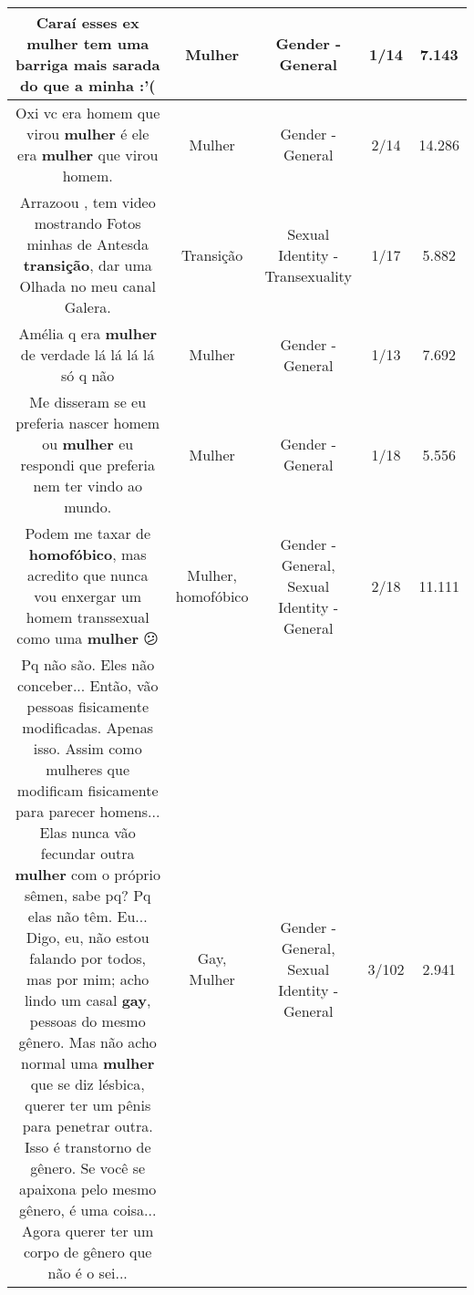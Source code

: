 \documentclass[11pt]{article}
\newlength\mylength
\begin{document}
\begin{center}
\begin{longtable}{|C{.65\mylength}|C{.30\mylength}|C{.12\mylength}|C{.12\mylength}|C{.12\mylength}|}
  \small Caraí esses ex \textbf{mulher} tem uma barriga mais  sarada do que a minha :'(\normalsize   & Mulher & Gender - General & 1/14 & 7.143 \\  \hline
  \small Oxi vc era homem que virou \textbf{mulher} é  ele era \textbf{mulher} que virou homem.\normalsize   & Mulher & Gender - General & 2/14 & 14.286 \\  \hline
  \small Arrazoou , tem video mostrando Fotos minhas de Antesda \textbf{transição}, dar uma Olhada no meu canal Galera.\normalsize   & Transição & Sexual Identity - Transexuality & 1/17 & 5.882 \\  \hline
  \small Amélia q era \textbf{mulher} de verdade lá lá lá lá só q não\normalsize   & Mulher & Gender - General & 1/13 & 7.692 \\  \hline
  \small Me disseram se eu preferia nascer homem ou \textbf{mulher} eu respondi que preferia nem ter vindo ao mundo.\normalsize   & Mulher & Gender - General & 1/18 & 5.556 \\  \hline
  \small Podem me taxar de \textbf{homofóbico}, mas acredito que nunca vou enxergar um homem transsexual como uma \textbf{mulher} 😕\normalsize   & Mulher, homofóbico & Gender - General, Sexual Identity - General & 2/18 & 11.111 \\  \hline
  \small Pq não são. Eles não conceber... Então, vão pessoas fisicamente modificadas. Apenas isso. Assim como mulheres que modificam fisicamente para parecer homens... Elas nunca vão fecundar outra \textbf{mulher} com o próprio sêmen, sabe pq? Pq elas não têm. Eu... Digo, eu, não estou falando por todos, mas por mim; acho lindo um casal \textbf{gay}, pessoas do mesmo gênero. Mas não acho normal uma \textbf{mulher} que se diz lésbica, querer ter um pênis para penetrar outra. Isso é transtorno de gênero. Se você se apaixona pelo mesmo gênero, é uma coisa... Agora querer ter um corpo de gênero que não é o sei...\normalsize   & Gay, Mulher & Gender - General, Sexual Identity - General & 3/102 & 2.941 \\  \hline

\end{longtable}
\end{center}
\end{document}
